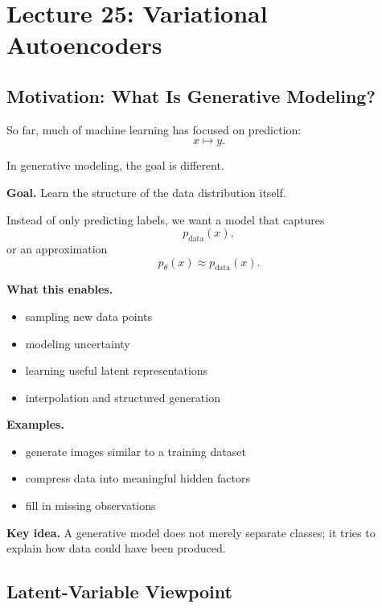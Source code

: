\section{Lecture 25: Variational Autoencoders}

\subsection{Motivation: What Is Generative Modeling?}

So far, much of machine learning has focused on prediction:
\[
x \mapsto y.
\]

In generative modeling, the goal is different.

\medskip

\noindent
\textbf{Goal.}  
Learn the structure of the data distribution itself.

\medskip

\noindent
Instead of only predicting labels, we want a model that captures
\[
p_{\text{data}}(x),
\]
or an approximation
\[
p_\theta(x) \approx p_{\text{data}}(x).
\]

\medskip

\noindent
\textbf{What this enables.}

\begin{itemize}
    \item sampling new data points
    \item modeling uncertainty
    \item learning useful latent representations
    \item interpolation and structured generation
\end{itemize}

\medskip

\noindent
\textbf{Examples.}

\begin{itemize}
    \item generate images similar to a training dataset
    \item compress data into meaningful hidden factors
    \item fill in missing observations
\end{itemize}

\medskip

\noindent
\textbf{Key idea.}  
A generative model does not merely separate classes; it tries to explain how data could have been produced.

\subsection{Latent-Variable Viewpoint}


